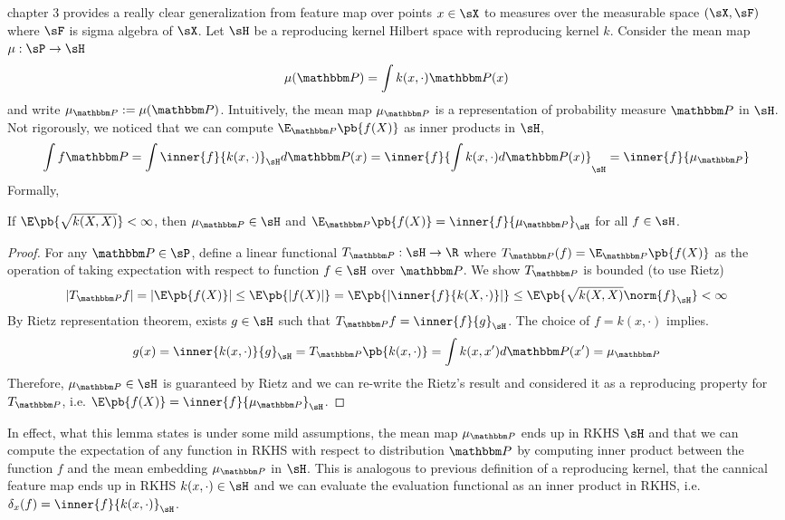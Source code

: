\documentclass[11pt]{article}
\begin{document}
\cite{muandetKernelMeanEmbedding2017} chapter 3 provides a really clear generalization from feature map over points $x\in\sX$ to measures over the measurable space $(\sX,\sF)$ where $\sF$ is sigma algebra of $\sX$. Let $\sH$ be a reproducing kernel Hilbert space with reproducing kernel $k$. Consider the mean map $\mu:\sP\to\sH$
\begin{align}
    \mu(\bbP)
        = \int k(x,\cdot) \bbP(x)
\end{align}
and write $\mu_{\bbP} := \mu(\bbP)$. Intuitively, the mean map $\mu_{\bbP}$ is a representation of probability measure $\bbP$ in $\sH$. Not rigorously, we noticed that we can compute $\E_{\bbP}\pb{f(X)}$ as inner products in $\sH$,
\[
    \int f \bbP
        = \int \inner{f}{k(x,\cdot)}_{\sH} d\bbP(x)
        = \inner{f}{\int k(x,\cdot)d\bbP(x)}_{\sH}
        = \inner{f}{\mu_{\bbP}}
\]
Formally,
\begin{lemma}
    If $\E\pb{\sqrt{k(X,X)}} < \infty$, then $\mu_{\bbP} \in \sH$ and $\E_{\bbP}\pb{f(X)} = \inner{f}{\mu_{\bbP}}_{\sH}$ for all $f\in\sH$.
\end{lemma}
\begin{proof}
    For any $\bbP\in\sP$, define a linear functional $T_{\bbP}:\sH\to\R$ where $T_{\bbP}(f) = \E_{\bbP}\pb{f(X)}$ as the operation of taking expectation with respect to function $f\in\sH$ over $\bbP$. We show $T_{\bbP}$ is bounded (to use Rietz)
    \begin{align*}
        |T_{\bbP}f|
            = |\E\pb{f(X)}|
            \leq \E\pb{|f(X)|}
            = \E\pb{ \left|  \inner{f}{k(X,\cdot)} \right| }
            \leq \E\pb{ \sqrt{k(X,X)} \norm{f}_{\sH} }
            < \infty
    \end{align*}
    By Rietz representation theorem, exists $g\in\sH$ such that $T_{\bbP} f = \inner{f}{g}_{\sH}$. The choice of $f = k(x,\cdot)$ implies.
    \[
        g(x)
            = \inner{k(x,\cdot)}{g}_{\sH} 
            = T_{\bbP}\pb{k(x,\cdot)}
            = \int k(x,x') d\bbP(x')
            = \mu_{\bbP}
    \]
    Therefore, $\mu_{\bbP}\in\sH$ is guaranteed by Rietz and we can re-write the Rietz's result and considered it as a reproducing property for $T_{\bbP}$, i.e. $\E\pb{f(X)} = \inner{f}{\mu_{\bbP}}_{\sH}$.
\end{proof}
In effect, what this lemma states is under some mild assumptions, the mean map $\mu_{\bbP}$ ends up in RKHS $\sH$ and that we can compute the expectation of any function in RKHS with respect to distribution $\bbP$ by computing inner product between the function $f$ and the mean embedding $\mu_{\bbP}$ in $\sH$. This is analogous to previous definition of a reproducing kernel, that the cannical feature map ends up in RKHS $k(x,\cdot) \in \sH$ and we can evaluate the evaluation functional as an inner product in RKHS, i.e. $\delta_x(f) = \inner{f}{k(x,\cdot)}_{\sH}$. 
\end{document}

